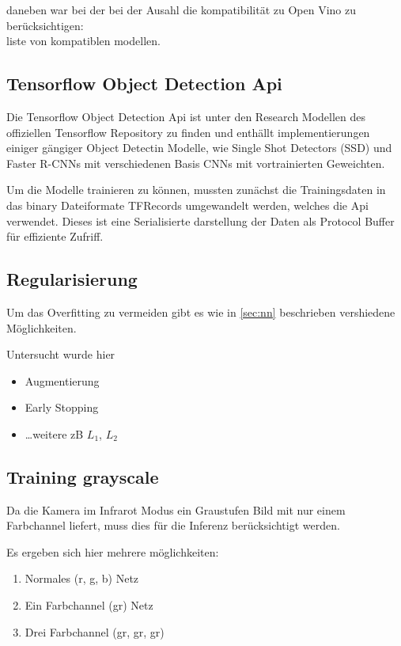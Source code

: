 daneben war bei der bei der Ausahl die kompatibilität zu Open Vino zu berücksichtigen:\\
liste von kompatiblen modellen.


\subsection{Tensorflow Object Detection Api}

Die Tensorflow Object Detection Api ist unter den Research Modellen
\cite{HttpsGithubCom} des offiziellen Tensorflow Repository zu
finden und enthällt implementierungen einiger gängiger Object Detectin
Modelle, wie Single Shot Detectors (SSD) und Faster R-CNNs mit 
verschiedenen Basis CNNs mit vortrainierten Geweichten.

Um die Modelle trainieren zu können, mussten zunächst die 
Trainingsdaten in das binary Dateiformate TFRecords umgewandelt 
werden, welches die Api verwendet. Dieses ist eine Serialisierte 
darstellung der Daten als Protocol Buffer für effiziente Zufriff.



\subsection{Regularisierung}

Um das Overfitting zu vermeiden gibt es wie in \ref{sec:nn} 
beschrieben vershiedene Möglichkeiten.

Untersucht wurde hier

\begin{itemize}
    \item Augmentierung
    \item Early Stopping
    \item \dots weitere zB $L_{1}$, $L_{2}$
\end{itemize}



\subsection{Training grayscale}\label{subsec:train_gray}

Da die Kamera im Infrarot Modus ein Graustufen Bild mit nur einem 
Farbchannel liefert, muss dies für die Inferenz berücksichtigt werden.

Es ergeben sich hier mehrere möglichkeiten:

\begin{enumerate}
    \item Normales (r, g, b) Netz
    \item Ein Farbchannel (gr) Netz
    \item Drei Farbchannel (gr, gr, gr)
\end{enumerate}

